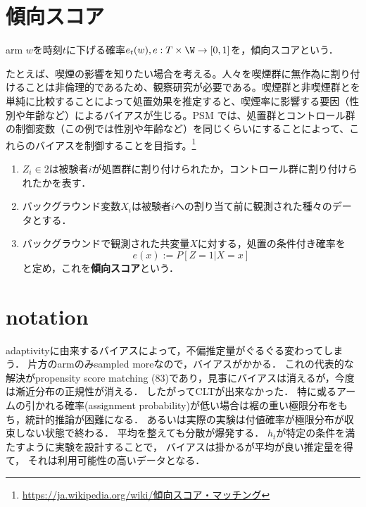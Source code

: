 \documentclass[uplatex,dvipdfmx]{jsreport}
\begin{document}
\section{傾向スコア}

\begin{tcolorbox}[colframe=ForestGreen, colback=ForestGreen!10!white,breakable,colbacktitle=ForestGreen!40!white,coltitle=black,fonttitle=\bfseries\sffamily,
title=]
    arm $w$を時刻$t$に下げる確率$e_t(w),e:T\times\W\to[0,1]$を，傾向スコアという．
\end{tcolorbox}

たとえば、喫煙の影響を知りたい場合を考える。人々を喫煙群に無作為に割り付けることは非倫理的であるため、観察研究が必要である。喫煙群と非喫煙群とを単純に比較することによって処置効果を推定すると、喫煙率に影響する要因（性別や年齢など）によるバイアスが生じる。PSM では、処置群とコントロール群の制御変数（この例では性別や年齢など）を同じくらいにすることによって、これらのバイアスを制御することを目指す。\footnote{\url{https://ja.wikipedia.org/wiki/傾向スコア・マッチング}}

\begin{definition}\mbox{}
    \begin{enumerate}
        \item $Z_i\in 2$は被験者$i$が処置群に割り付けられたか，コントロール群に割り付けられたかを表す．
        \item バックグラウンド変数$X_i$は被験者$i$への割り当て前に観測された種々のデータとする．
        \item バックグラウンドで観測された共変量$X$に対する，処置の条件付き確率を
        \[e(x):=P[Z=1|X=x]\]
        と定め，これを\textbf{傾向スコア}という．
    \end{enumerate}
\end{definition}

\section{notation}

\begin{tcolorbox}[colframe=ForestGreen, colback=ForestGreen!10!white,breakable,colbacktitle=ForestGreen!40!white,coltitle=black,fonttitle=\bfseries\sffamily,
title=RosenbaumとRubinを超えていく]
    adaptivityに由来するバイアスによって，不偏推定量がぐるぐる変わってしまう．
    片方のarmのみsampled moreなので，バイアスがかかる．
    これの代表的な解決がpropensity score matching (83)であり，見事にバイアスは消えるが，今度は漸近分布の正規性が消える．
    したがってCLTが出来なかった．
    特に或るアームの引かれる確率(assignment probability)が低い場合は裾の重い極限分布をもち，統計的推論が困難になる．
    あるいは実際の実験は付値確率が極限分布が収束しない状態で終わる．
    平均を整えても分散が爆発する．
    $h_t$が特定の条件を満たすように実験を設計することで，
    バイアスは掛かるが平均が良い推定量を得て，
    それは利用可能性の高いデータとなる．
\end{tcolorbox}
\end{document}
